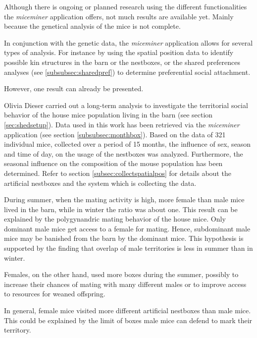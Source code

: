 Although there is ongoing or planned research using the different functionalities the \textit{miceminer} application offers, not much results are available yet. Mainly because the genetical analysis of the mice is not complete. 
 
In conjunction with the genetic data, the \textit{miceminer} application allows for several types of analysis. For instance by using the spatial position data to identify possible kin structures in the barn or the nestboxes, or the shared preferences analyses (see \ref{subsubsec:sharedpref}) to determine preferential social attachment. 
 
However, one result can already be presented.
 
Olivia Dieser \citep{dieser:08} carried out a long-term analysis to investigate the territorial social behavior of the house mice population living in the barn (see section \ref{sec:shedsetup}). Data used in this work has been retrieved via the \textit{miceminer} application (see section \ref{subsubsec:monthbox}). Based on the data of 321 individual mice, collected over a period of 15 months, the influence of sex, season and time of day, on the usage of the nestboxes was analyzed. Furthermore, the seasonal influence on the composition of the mouse population has been determined. Refer to section \ref{subsec:collectspatialpos} for details about the artificial nestboxes and the system which is collecting the data.
 
During summer, when the mating activity is high, more female than male mice lived in the barn, while in winter the ratio was about one. This result can be explained by the polygynandric mating behavior of the house mice. Only dominant male mice get access to a female for mating. Hence, subdominant male mice may be banished from the barn by the dominant mice. This hypothesis is supported by the finding that overlap of male territories is less in summer than in winter. 
 
Females, on the other hand, used more boxes during the summer, possibly to increase their chances of mating with many different males or to improve access to resources for weaned offspring.
 
In general, female mice visited more different artificial nestboxes than male mice. This could be explained by the limit of boxes male mice can defend to mark their territory.